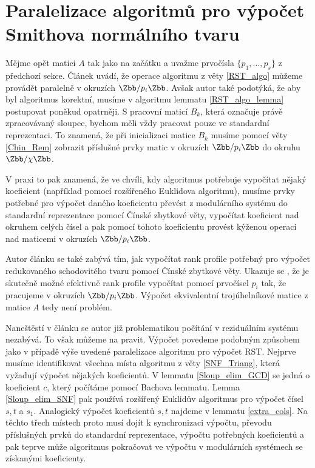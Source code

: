 \section{Paralelizace algoritmů pro výpočet Smithova normálního tvaru}
Mějme opět matici $ A $ tak jako na začátku a uvažme prvočísla
$ \{ p_1, \dots, p_s \} $ z předchozí sekce. Článek \cite[Theorem 16]{triang}
uvádí, že operace algoritmu z věty \ref{RST_algo} můžeme provádět paralelně
v okruzích $ \Zbb / p_i \Zbb $. Avšak autor také podotýká, že aby byl algoritmus
korektní, musíme v algoritmu lemmatu \ref{RST_algo_lemma} postupovat poněkud
opatrněji. S pracovní maticí $ B_k $, která označuje právě zpracovávaný sloupec,
bychom měli vždy pracovat pouze ve standardní reprezentaci. To znamená, že při
inicializaci matice $ B_k $ musíme pomocí věty \ref{Chin_Rem} zobrazit příslušné
prvky matic v okruzích $ \Zbb / p_i \Zbb $ do okruhu $ \Zbb / \chi \Zbb $.

V praxi to pak znamená, že ve chvíli, kdy algoritmus potřebuje vypočítat nějaký
koeficient (například pomocí rozšířeného Euklidova algoritmu), musíme prvky
potřebné pro výpočet daného koeficientu převést z modulárního systému do standardní
reprezentace pomocí Čínské zbytkové věty, vypočítat koeficient nad okruhem celých
čísel a pak pomocí tohoto koeficientu provést kýženou operaci nad maticemi v
okruzích $ \Zbb / p_i \Zbb $.

Autor článku \cite{triang} se
také zabývá tím, jak vypočítat rank profile potřebný pro výpočet redukovaného
schodovitého tvaru pomocí Čínské zbytkové věty. Ukazuje se \cite[Theorem 15]{triang},
že je skutečně možné efektivně rank profile vypočítat pomocí prvočísel $ p_i $
tak, že pracujeme v okruzích $ \Zbb / p_i \Zbb $.
Výpočet ekvivalentní trojúhelníkové matice z matice $ A $ tedy není problém.

Naneštěstí v článku \cite{SNF_Arne} se autor již problematikou počítání v
reziduálním systému nezabývá. To však můžeme na
pravit. Výpočet povedeme podobným
způsobem jako v případě výše uvedené paralelizace algoritmu pro výpočet RST.
Nejprve musíme identifikovat všechna místa algoritmu z věty \ref{SNF_Triang},
která vyžadují výpočet nějakých koeficientů. V lemmatu \ref{Sloup_elim_GCD}
se jedná o koeficient $ c $, který počítáme pomocí Bachova lemmatu. Lemma
\ref{Sloup_elim_SNF} pak používá rozšířený Euklidův algoritmus pro výpočet čísel
$ s, t $ a $ s_1 $. Analogický výpočet koeficientů $ s, t $ najdeme v lemmatu
\ref{extra_cols}. Na těchto třech místech proto musí dojít k synchronizaci výpočtu,
převodu příslušných prvků do standardní reprezentace, výpočtu potřebných
koeficientů a pak teprve může algoritmus pokračovat ve výpočtu v modulárních
systémech se získanými koeficienty.

